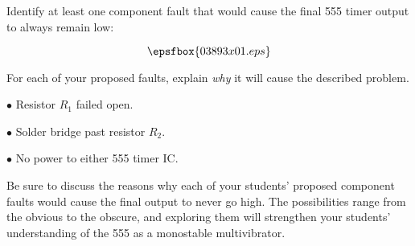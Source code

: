 

Identify at least one component fault that would cause the final 555 timer output to always remain low:

$$\epsfbox{03893x01.eps}$$

For each of your proposed faults, explain {\it why} it will cause the described problem.







\medskip
\item{$\bullet$} Resistor $R_1$ failed open.
\vskip 5pt
\item{$\bullet$} Solder bridge past resistor $R_2$.
\vskip 5pt
\item{$\bullet$} No power to either 555 timer IC.
\medskip







Be sure to discuss the reasons why each of your students' proposed component faults would cause the final output to never go high.  The possibilities range from the obvious to the obscure, and exploring them will strengthen your students' understanding of the 555 as a monostable multivibrator.





